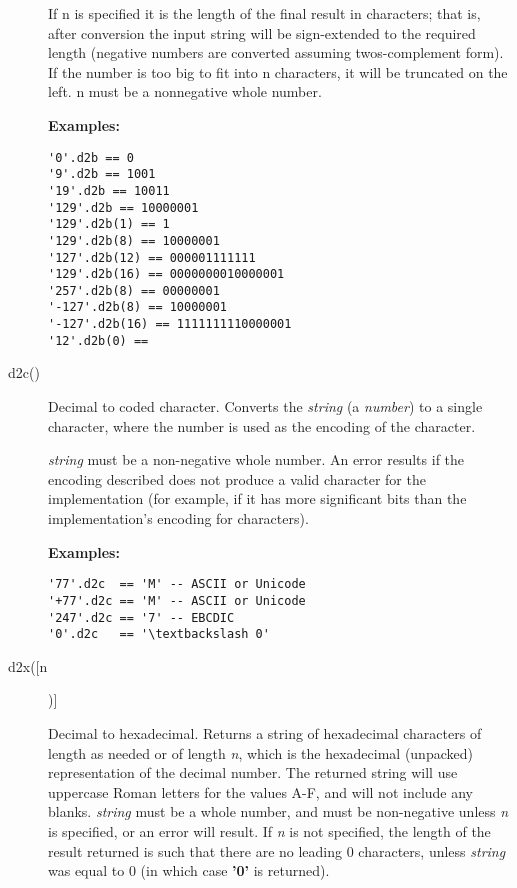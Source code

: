 \begin{description}
If n is specified it is the length of the final result in characters;
that is, after conversion the input string will be sign-extended to
the required length (negative numbers are converted assuming
twos-complement form). If the number is too big to fit into n
characters, it will be truncated on the left. n must be a nonnegative
whole number.

 \textbf{Examples:}
\begin{lstlisting}
'0'.d2b == 0 
'9'.d2b == 1001 
'19'.d2b == 10011 
'129'.d2b == 10000001 
'129'.d2b(1) == 1 
'129'.d2b(8) == 10000001 
'127'.d2b(12) == 000001111111 
'129'.d2b(16) == 0000000010000001 
'257'.d2b(8) == 00000001 
'-127'.d2b(8) == 10000001 
'-127'.d2b(16) == 1111111110000001 
'12'.d2b(0) == 
\end{lstlisting}

\item[d2c()]\label{refd2c}
Decimal to coded character.
Converts the \emph{string} (a \nr{} \emph{number}) to a
single character, where the number is used as the encoding of the
character.
 
\emph{string} must be a non-negative whole number.
An error results if the encoding described does not produce a valid
character for the implementation (for example, if it has more
significant bits than the implementation's encoding for characters).
 
\textbf{Examples:}
\begin{lstlisting}
'77'.d2c  == 'M' -- ASCII or Unicode
'+77'.d2c == 'M' -- ASCII or Unicode
'247'.d2c == '7' -- EBCDIC
'0'.d2c   == '\textbackslash 0'
\end{lstlisting}
\item[d2x([n])]\label{refd2x}

Decimal to hexadecimal.
Returns a string of hexadecimal characters of length as needed or of
length \emph{n}, which is the hexadecimal (unpacked) representation
of the decimal number.  The returned string will use uppercase
Roman letters for the values A-F, and will not include any blanks.
 \emph{string} must be a whole number, and must be non-negative
unless \emph{n} is specified, or an error will result.
If \emph{n} is not specified, the length of the result returned is
such that there are no leading 0 characters, unless \emph{string}
was equal to 0 (in which case \textbf{'0'} is returned).
 

\end{description}
